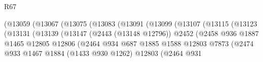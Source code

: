 \begin{lexlean}{R67}
\begin{coremodule}
                                              (@13059
                                                (@13067
                                                  (@13075
                                                    (@13083
                                                      (@13091
                                                        (@13099
                                                          (@13107
                                                            (@13115
                                                              (@13123
                                                                (@13131
                                                                  (@13139
                                                                    (@13147
                                                                      (@2443 (@13148 @12796))
                                                                      @2452
                                                                      (@2458
                                                                        @936
                                                                        @1887
                                                                        @1465
                                                                        @12805
                                                                        @12806
                                                                        (@2464
                                                                          @934
                                                                          @687
                                                                          @1885
                                                                          @1588
                                                                          @12803
                                                                          @7873
                                                                          (@2474
                                                                            @933
                                                                            @1467
                                                                            @1884
                                                                            (@1433 @930 @1262)
                                                                            @12803
                                                                            (@2464
                                                                              @931

\end{coremodule}
\end{lexlean}

